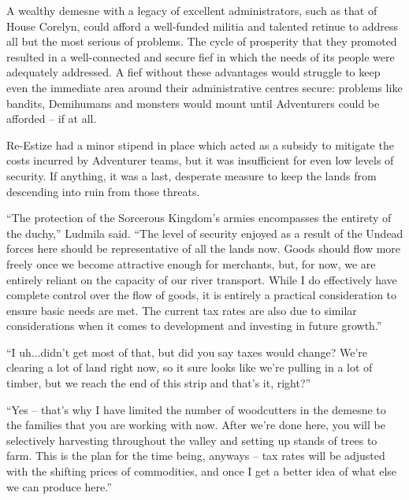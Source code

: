  

A wealthy demesne with a legacy of excellent administrators, such as that of House Corelyn, could afford a well-funded militia and talented retinue to address all but the most serious of problems. The cycle of prosperity that they promoted resulted in a well-connected and secure fief in which the needs of its people were adequately addressed. A fief without these advantages would struggle to keep even the immediate area around their administrative centres secure: problems like bandits, Demihumans and monsters would mount until Adventurers could be afforded – if at all.

 

Re-Estize had a minor stipend in place which acted as a subsidy to mitigate the costs incurred by Adventurer teams, but it was insufficient for even low levels of security. If anything, it was a last, desperate measure to keep the lands from descending into ruin from those threats.

 

“The protection of the Sorcerous Kingdom’s armies encompasses the entirety of the duchy,” Ludmila said. “The level of security enjoyed as a result of the Undead forces here should be representative of all the lands now. Goods should flow more freely once we become attractive enough for merchants, but, for now, we are entirely reliant on the capacity of our river transport. While I do effectively have complete control over the flow of goods, it is entirely a practical consideration to ensure basic needs are met. The current tax rates are also due to similar considerations when it comes to development and investing in future growth.”

 

“I uh...didn’t get most of that, but did you say taxes would change? We’re clearing a lot of land right now, so it sure looks like we’re pulling in a lot of timber, but we reach the end of this strip and that’s it, right?”

 

“Yes – that’s why I have limited the number of woodcutters in the demesne to the families that you are working with now. After we’re done here, you will be selectively harvesting throughout the valley and setting up stands of trees to farm. This is the plan for the time being, anyways – tax rates will be adjusted with the shifting prices of commodities, and once I get a better idea of what else we can produce here.”

 

